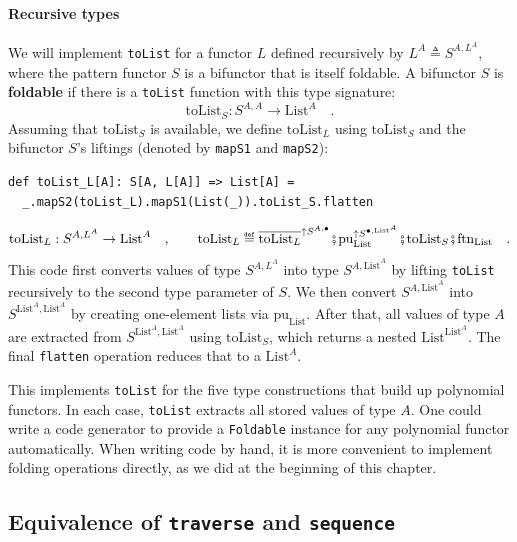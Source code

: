 \paragraph{Recursive types}

We will implement \lstinline!toList! for a functor $L$ defined recursively
by $L^{A}\triangleq S^{A,L^{A}}$, where the pattern functor $S$
is a bifunctor that is itself foldable. A bifunctor $S$ is \textbf{foldable}
if there is a \lstinline!toList! function with this type signature:
\[
\text{toList}_{S}:S^{A,A}\rightarrow\text{List}^{A}\quad.
\]
Assuming that $\text{toList}_{S}$ is available, we define $\text{toList}_{L}$
using $\text{toList}_{S}$ and the bifunctor $S$\textsf{'}s liftings (denoted
by \lstinline!mapS1! and \lstinline!mapS2!):
\begin{lstlisting}
def toList_L[A]: S[A, L[A]] => List[A] =
  _.mapS2(toList_L).mapS1(List(_)).toList_S.flatten
\end{lstlisting}
\[
\text{toList}_{L}:S^{A,L^{A}}\rightarrow\text{List}^{A}\quad,\quad\quad\text{toList}_{L}\triangleq\overline{\text{toList}_{L}}^{\uparrow S^{A,\bullet}}\bef\text{pu}_{\text{List}}^{\uparrow S^{\bullet,\text{List}^{A}}}\bef\text{toList}_{S}\bef\text{ftn}_{\text{List}}\quad.
\]
This code first converts values of type $S^{A,L^{A}}$ into type $S^{A,\text{List}^{A}}$
by lifting \lstinline!toList! recursively to the second type parameter
of $S$. We then convert $S^{A,\text{List}^{A}}$ into $S^{\text{List}^{A},\text{List}^{A}}$
by creating one-element lists via $\text{pu}_{\text{List}}$. After
that, all values of type $A$ are extracted from $S^{\text{List}^{A},\text{List}^{A}}$
using $\text{toList}_{S}$, which returns a nested $\text{List}^{\text{List}^{A}}$.
The final \lstinline!flatten! operation reduces that to a $\text{List}^{A}$.

This implements \lstinline!toList! for the five type constructions
that build up polynomial functors. In each case, \lstinline!toList!
extracts all stored values of type $A$. One could write a code generator
to provide a \lstinline!Foldable! instance for any polynomial functor
automatically. When writing code by hand, it is more convenient to
implement folding operations directly, as we did at the beginning
of this chapter.

\subsection{Equivalence of \texttt{traverse} and \texttt{sequence}}

